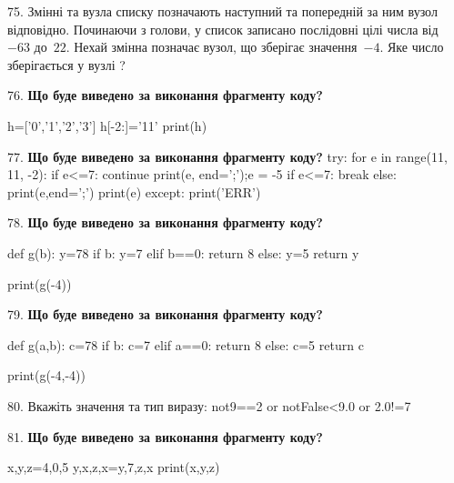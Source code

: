 \documentclass[11pt]{article}
\begin{document}
75. 
Змінні  та  вузла списку позначають наступний та попередній за ним вузол відповідно. Починаючи з голови, у список записано послідовні цілі числа від~$-63$ до~$22$. Нехай змінна  позначає вузол, що зберігає значення~$-4$.
Яке число зберігається у вузлі  ?
\par\vspace{5mm}

76. \textbf{Що буде виведено за виконання фрагменту коду?}

h=['0','1','2','3']
h[-2:]='11'
print(h)

\par\vspace{5mm}

77. \textbf{Що буде виведено за виконання фрагменту коду?}
try:
    for e in range(11, 11, -2):
        if e<=7:
            continue
        print(e, end=';');e = -5
        if e<=7:
            break
    else:
        print(e,end=';')
    print(e)
except:
    print('ERR')
\par\vspace{5mm}

78. \textbf{Що буде виведено за виконання фрагменту коду?}

def g(b):
    y=78
    if b: 
        y=7
    elif b==0:
         return 8
    else:
         y=5
    return y

print(g(-4))
\par\vspace{5mm}

79. \textbf{Що буде виведено за виконання фрагменту коду?}

def g(a,b):
    c=78
    if b:
        c=7
    elif a==0:
         return 8
    else: 
        c=5
    return c

print(g(-4,-4))
\par\vspace{5mm}

80. 
Вкажіть значення та тип виразу:
not9==2 or notFalse<9.0 or 2.0!=7
\par\vspace{5mm}

81. \textbf{Що буде виведено за виконання фрагменту коду?}

x,y,z=4,0,5
y,x,z,x=y,7,z,x
print(x,y,z)
\par\vspace{5mm}
\end{document}
